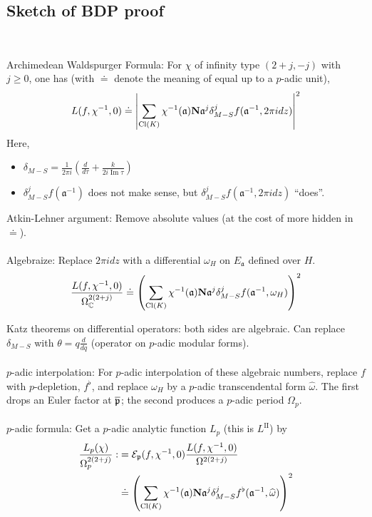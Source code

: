 \documentclass[12pt,amsfont]{amsart}
\begin{document}
\subsection{Sketch of BDP proof}
{\ }

Archimedean Waldspurger Formula: For $\chi$ of infinity type $(2+j, -j)$ with $j \geq 0$, one has (with $\doteq $ denote the meaning of equal up to a $p$-adic unit),
\[L(f, \chi^{-1}, 0) \doteq \left \lvert \sum_{\operatorname{Cl}(K)} \chi^{-1} (\mathfrak{a}) \textbf{N}\mathfrak{a}^j \delta_{M-S}^j f(\mathfrak{a}^{-1}, 2\pi i dz)\right \rvert^2\]
Here, 
\begin{itemize}
\item
$\delta_{M-S} = \frac{1}{2 \pi i} \left(\frac{d}{d\tau} + \frac{k}{2i \operatorname{Im} \tau} \right)$
\item
$\delta_{M-S}^j f(\mathfrak{a}^{-1})$ does not make sense, but $\delta_{M-S}^j f(\mathfrak{a}^{-1}, 2\pi i dz)$ ``does''. 
\end{itemize}

Atkin-Lehner argument: Remove absolute values (at the cost of more hidden in $\doteq$). \\ \\
Algebraize: Replace $2 \pi i dz$ with a differential $\omega_H$ on $E_\mathfrak{a}$ defined over $H$.
\[\frac{L(f, \chi^{-1}, 0)}{\Omega_{\mathbb C}^{2(2+j)}} \doteq \left(\sum_{\operatorname{Cl}(K)} \chi^{-1} (\mathfrak{a}) \textbf{N}\mathfrak{a}^j \delta_{M-S}^j f(\mathfrak{a}^{-1}, \omega_H)\right)^2\]

Katz theorems on differential operators: both sides are algebraic. Can replace $\delta_{M-S}$ with $\theta = q \frac{d}{dq}$ (operator on $p$-adic modular forms). \\ \\
$p$-adic interpolation: For $p$-adic interpolation of these algebraic numbers, replace $f$ with $p$-depletion, $f^\flat$, and replace $\omega_H$ by a $p$-adic transcendental form $\widehat{\omega}$. The first drops an Euler factor at $\overline{\mathfrak{p}}$; the second produces a $p$-adic period $\Omega_p$. \\ \\
$p$-adic formula: Get a $p$-adic analytic function $L_p$ (this is $L^{\text{II}}$) by 
\begin{align*} \displaystyle \frac{L_p(\chi)}{\Omega_p^{2(2+j)}}  :&= \mathcal{E}_{\mathfrak{p}}(f, \chi^{-1}, 0) \frac{L(f, \chi^{-1}, 0)}{\Omega^{2(2+j)}} \\ 
& \doteq \left(\sum_{\operatorname{Cl}(K)} \chi^{-1} (\mathfrak{a}) \textbf{N} \mathfrak{a}^j \delta_{M-S}^j f^\flat(\mathfrak{a}^{-1}, \widehat{\omega})\right)^2
\end{align*}
\end{document}
